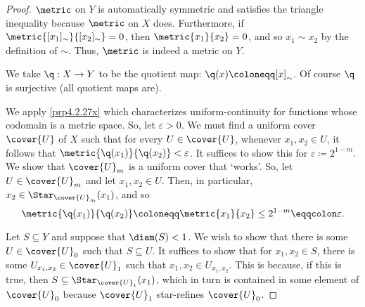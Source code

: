 \begin{thm}{}{}
\begin{proof}
$\metric$ on $Y$ is automatically symmetric and satisfies the triangle inequality because $\metric$ on $X$ does.  Furthermore, if $\metric{[x_1]_{\sim}}{[x_2]_{\sim}}=0$, then $\metric{x_1}{x_2}=0$, and so $x_1\sim x_2$ by the definition of $\sim$.  Thus, $\metric$ is indeed a metric on $Y$.

We take $\q :X\rightarrow Y$ to be the quotient map:  $\q (x)\coloneqq [x]_{\sim}$.  Of course $\q$ is surjective (all quotient maps are).

We apply \cref{prp4.2.27x} which characterizes uniform-continuity for functions whose codomain is a metric space.  So, let $\varepsilon >0$.  We must find a uniform cover $\cover{U}$ of $X$ such that for every $U\in \cover{U}$, whenever $x_1,x_2\in U$, it follows that $\metric{\q (x_1)}{\q (x_2)}<\varepsilon$.  It suffices to show this for $\varepsilon \coloneqq 2^{1-m}$.  We show that $\cover{U}_m$ is a uniform cover that `works'.  So, let $U\in \cover{U}_m$ and let $x_1,x_2\in U$.   Then, in particular, $x_2\in \Star _{\cover{U}_m}(x_1)$, and so
\begin{equation}
\metric{\q (x_1)}{\q (x_2)}\coloneqq \metric{x_1}{x_2}\leq 2^{1-m}\eqqcolon \varepsilon .
\end{equation}

Let $S\subseteq Y$ and suppose that $\diam (S)<1$.  We wish to show that there is some $U\in \cover{U}_0$ such that $S\subseteq U$.  It suffices to show that for $x_1,x_2\in S$, there is some $U_{x_1,x_2}\in \cover{U}_1$ such that $x_1,x_2\in U_{x_1,x_2}$.  This is because, if this is true, then $S\subseteq \Star _{\cover{U}_1}(x_1)$, which in turn is contained in some element of $\cover{U}_0$ because $\cover{U}_1$ star-refines $\cover{U}_0$.


\end{proof}
\end{thm}
